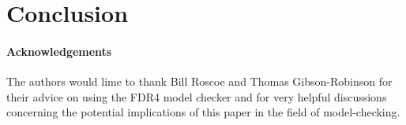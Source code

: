 \section{Conclusion}
\label{sec:conc}



\paragraph{Acknowledgements}
The authors would lime to thank Bill Roscoe and Thomas Gibson-Robinson for their advice on using the FDR4 model checker and for very helpful discussions concerning the potential implications of this paper in the field of model-checking.
